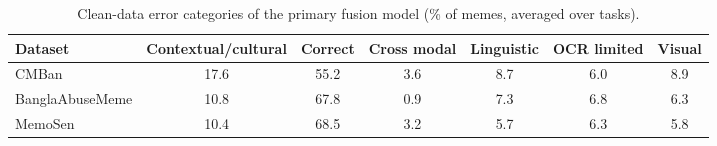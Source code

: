 \begin{table}[t]
\centering
\small
\caption{Clean-data error categories of the primary fusion model (\% of memes, averaged over tasks).}
\label{tab:cross_err}
\begin{adjustbox}{max width=\textwidth}
\begin{tabular}{lcccccc}
\toprule
Dataset & Contextual/cultural & Correct & Cross modal & Linguistic & OCR limited & Visual \\
\midrule
CMBan & 17.6 & 55.2 & 3.6 & 8.7 & 6.0 & 8.9 \\
BanglaAbuseMeme & 10.8 & 67.8 & 0.9 & 7.3 & 6.8 & 6.3 \\
MemoSen & 10.4 & 68.5 & 3.2 & 5.7 & 6.3 & 5.8 \\
\bottomrule
\end{tabular}
\end{adjustbox}
\end{table}
